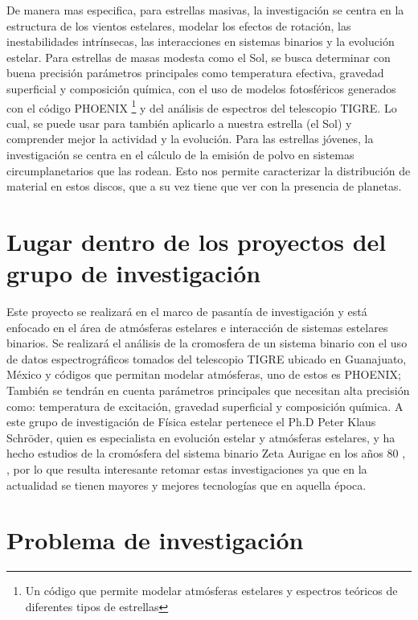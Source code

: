 \documentclass[11pt]{article}
\begin{document}
\noindent De manera mas especifica, para estrellas masivas, la investigación se centra en la estructura de los vientos estelares, modelar los efectos de rotación, las inestabilidades intrínsecas, las interacciones en sistemas binarios y la evolución estelar. Para estrellas de masas modesta como el Sol, se busca determinar con buena precisión parámetros principales como temperatura efectiva, gravedad superficial y composición química, con el uso de modelos fotosféricos generados con el código PHOENIX \footnote{Un código que permite modelar atmósferas estelares y espectros teóricos de diferentes tipos de estrellas} y del análisis de espectros del telescopio TIGRE. Lo cual, se puede usar para también aplicarlo a nuestra estrella (el Sol) y comprender mejor la actividad y la evolución. Para las estrellas jóvenes, la investigación se centra en el cálculo de la emisión de polvo en sistemas circumplanetarios que las rodean. Esto nos permite caracterizar la distribución de material en estos discos, que a su vez tiene que ver con la presencia de planetas. 

\section{Lugar dentro de los proyectos del grupo de investigación}
\noindent Este proyecto se realizará en el marco de pasantía de investigación y está enfocado en el área de atmósferas estelares e interacción de sistemas estelares binarios. Se realizará el análisis de la cromosfera de un sistema binario con el uso de datos espectrográficos tomados del telescopio TIGRE ubicado en Guanajuato, México y códigos que permitan modelar atmósferas, uno de estos es PHOENIX; También se tendrán en cuenta parámetros principales que necesitan alta precisión como: temperatura de excitación, gravedad superficial y composición química. A este grupo de investigación de Física estelar pertenece el Ph.D Peter Klaus Schröder, quien es especialista en evolución estelar y atmósferas estelares, y ha hecho estudios de la cromósfera del sistema binario Zeta Aurigae en los años 80 \cite{kps9}, \cite{kps1O}, por lo que resulta interesante retomar estas investigaciones ya que en la actualidad se tienen mayores y mejores tecnologías que en aquella época.

\section{Problema de investigación}
\end{document}
